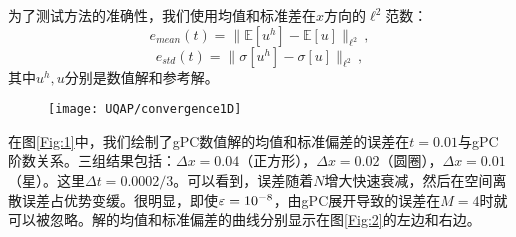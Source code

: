 为了测试方法的准确性，我们使用均值和标准差在$x$方向的$\ell^2$范数：
\begin{equation*}
  e_{mean}(t) = \big\|\mathbb{E}[u^h]-\mathbb{E}[u]\big\|_{\ell^2}\,,
\end{equation*}
\begin{equation*}
  e_{std}(t) = \big\|\sigma[u^h]-\sigma[u]\big\|_{\ell^2}\,,
\end{equation*}
其中$u^h,u$分别是数值解和参考解。
\begin{figure}[htbp]  
  \centering
  \texttt{[image: UQAP/convergence1D]}
\end{figure}

在图\ref{Fig:1}中，我们绘制了gPC数值解的均值和标准偏差的误差在$t = 0.01$与gPC阶数关系。三组结果包括：$\Delta x = 0.04$（正方形），$\Delta x = 0.02$（圆圈），$\Delta x = 0.01$（星）。这里$\Delta t = 0.0002 / 3$。可以看到，误差随着$N$增大快速衰减，然后在空间离散误差占优势变缓。很明显，即使$\varepsilon = 10^{-8}$，由gPC展开导致的误差在$M = 4$时就可以被忽略。解的均值和标准偏差的曲线分别显示在图\ref{Fig:2}的左边和右边。

